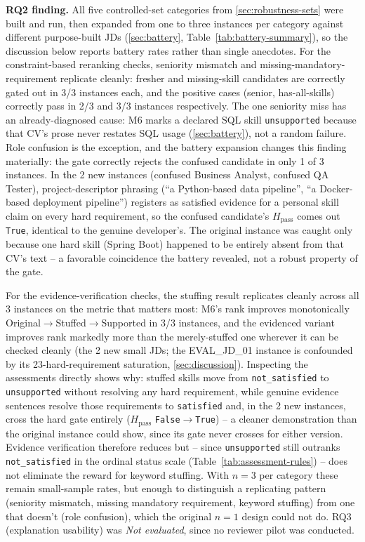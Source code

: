 \documentclass[12pt,a4paper,oneside]{report}
\begin{document}
\textbf{RQ2 finding.} All five controlled-set categories from \cref{sec:robustness-sets} were built and run, then expanded from one to three instances per category against different purpose-built JDs (\cref{sec:battery}, Table~\ref{tab:battery-summary}), so the discussion below reports battery rates rather than single anecdotes. For the constraint-based reranking checks, seniority mismatch and missing-mandatory-requirement replicate cleanly: fresher and missing-skill candidates are correctly gated out in 3/3 instances each, and the positive cases (senior, has-all-skills) correctly pass in 2/3 and 3/3 instances respectively. The one seniority miss has an already-diagnosed cause: M6 marks a declared SQL skill \texttt{unsupported} because that CV's prose never restates SQL usage (\cref{sec:battery}), not a random failure. Role confusion is the exception, and the battery expansion changes this finding materially: the gate correctly rejects the confused candidate in only 1 of 3 instances. In the 2 new instances (confused Business Analyst, confused QA Tester), project-descriptor phrasing (``a Python-based data pipeline'', ``a Docker-based deployment pipeline'') registers as satisfied evidence for a personal skill claim on every hard requirement, so the confused candidate's $H_{\mathrm{pass}}$ comes out \texttt{True}, identical to the genuine developer's. The original instance was caught only because one hard skill (Spring Boot) happened to be entirely absent from that CV's text -- a favorable coincidence the battery revealed, not a robust property of the gate.

For the evidence-verification checks, the stuffing result replicates cleanly across all 3 instances on the metric that matters most: M6's rank improves monotonically Original$\to$Stuffed$\to$Supported in 3/3 instances, and the evidenced variant improves rank markedly more than the merely-stuffed one wherever it can be checked cleanly (the 2 new small JDs; the EVAL\_JD\_01 instance is confounded by its 23-hard-requirement saturation, \cref{sec:discussion}). Inspecting the assessments directly shows why: stuffed skills move from \texttt{not\_satisfied} to \texttt{unsupported} without resolving any hard requirement, while genuine evidence sentences resolve those requirements to \texttt{satisfied} and, in the 2 new instances, cross the hard gate entirely ($H_{\mathrm{pass}}$ \texttt{False}$\to$\texttt{True}) -- a cleaner demonstration than the original instance could show, since its gate never crosses for either version. Evidence verification therefore reduces but -- since \texttt{unsupported} still outranks \texttt{not\_satisfied} in the ordinal status scale (Table~\ref{tab:assessment-rules}) -- does not eliminate the reward for keyword stuffing. With $n=3$ per category these remain small-sample rates, but enough to distinguish a replicating pattern (seniority mismatch, missing mandatory requirement, keyword stuffing) from one that doesn't (role confusion), which the original $n=1$ design could not do. RQ3 (explanation usability) was \emph{Not evaluated}, since no reviewer pilot was conducted.
\end{document}
